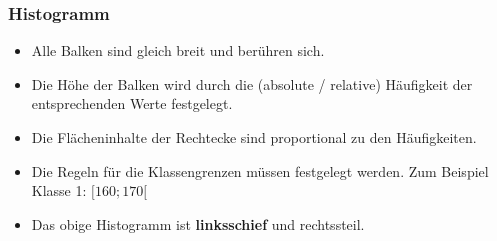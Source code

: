 \begin{multicols}{2}
\keinHeaderUndKeinFooter{}

\subsubsection*{Histogramm}
\keinHeaderUndKeinFooter{}

\begin{itemize}
\item Alle Balken sind gleich breit und berühren sich.
\item Die Höhe der Balken wird durch die (absolute / relative) Häufigkeit der entsprechenden
  Werte festgelegt.
\item Die Flächeninhalte der Rechtecke sind proportional
  zu den Häufigkeiten.
\item Die Regeln für die Klassengrenzen müssen festgelegt werden. Zum
  Beispiel Klasse 1: $[160; 170[$
\item Das obige Histogramm ist \textbf{linksschief} und rechtssteil.
\end{itemize}



\end{multicols}


